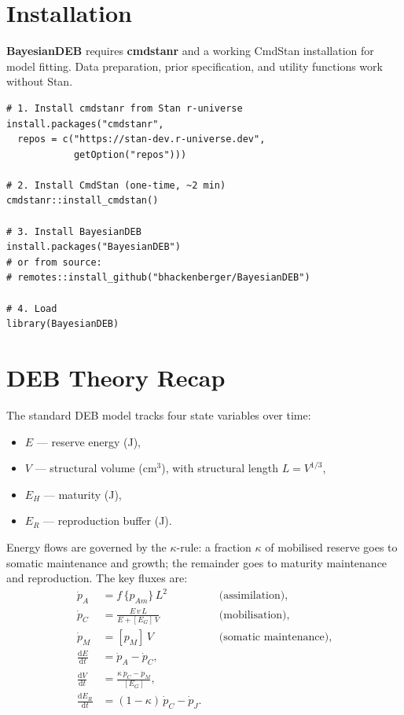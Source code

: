 \documentclass[11pt,a4paper]{article}
\newcommand{\pkg}[1]{\textbf{#1}}
\newcommand{\Stan}{\textsf{Stan}}
\begin{document}
\section{Installation}
\label{sec:installation}

\pkg{BayesianDEB} requires \pkg{cmdstanr} and a working CmdStan
installation for model fitting.  Data preparation, prior specification,
and utility functions work without \Stan{}.

\begin{lstlisting}
# 1. Install cmdstanr from Stan r-universe
install.packages("cmdstanr",
  repos = c("https://stan-dev.r-universe.dev",
            getOption("repos")))

# 2. Install CmdStan (one-time, ~2 min)
cmdstanr::install_cmdstan()

# 3. Install BayesianDEB
install.packages("BayesianDEB")
# or from source:
# remotes::install_github("bhackenberger/BayesianDEB")

# 4. Load
library(BayesianDEB)
\end{lstlisting}

\section{DEB Theory Recap}
\label{sec:deb-recap}

The standard DEB model tracks four state variables over time:
\begin{itemize}[nosep]
  \item $E$ --- reserve energy (J),
  \item $V$ --- structural volume (cm$^3$), with structural length $L = V^{1/3}$,
  \item $E_H$ --- maturity (J),
  \item $E_R$ --- reproduction buffer (J).
\end{itemize}

Energy flows are governed by the $\kappa$-rule: a fraction $\kappa$ of
mobilised reserve goes to somatic maintenance and growth; the remainder
goes to maturity maintenance and reproduction.  The key fluxes are:
\begin{align}
  \dot{p}_A &= f\,\{p_{Am}\}\,L^2  &&\text{(assimilation)}, \label{eq:pA}\\
  \dot{p}_C &= \frac{E\,v\,L}{E + [E_G]\,V}  &&\text{(mobilisation)}, \label{eq:pC}\\
  \dot{p}_M &= [p_M]\,V  &&\text{(somatic maintenance)}, \label{eq:pM}\\
  \frac{\mathrm{d}E}{\mathrm{d}t} &= \dot{p}_A - \dot{p}_C,  \label{eq:dE}\\
  \frac{\mathrm{d}V}{\mathrm{d}t} &= \frac{\kappa\,\dot{p}_C - \dot{p}_M}{[E_G]},  \label{eq:dV}\\
  \frac{\mathrm{d}E_R}{\mathrm{d}t} &= (1-\kappa)\,\dot{p}_C - \dot{p}_J.  \label{eq:dR}
\end{align}
\end{document}
